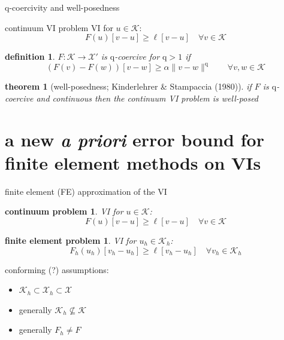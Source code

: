 \documentclass[10pt,svgnames]{beamer}
\newtheorem*{defn}{definition}
\newtheorem*{thm}{theorem}
\newtheorem*{cproblem}{continuum problem}
\newtheorem*{feproblem}{finite element problem}
\newcommand{\cK}{\mathcal{K}}
\newcommand{\cX}{\mathcal{X}}
\newcommand{\qq}{\mathrm{q}}
\newcommand{\aler}[1]{{\color{FireBrick} #1}}
\begin{document}
\begin{frame}{$\qq$-coercivity and well-posedness}

\begin{block}{continuum VI problem}
VI for $u \in \cK$:
$$F(u)[v-u] \ge \ell[v-u] \quad \forall v \in \cK$$
\end{block}

\begin{defn} $F:\cK \to \cX'$ is \aler{$\qq$-coercive} for $\qq>1$ if
  $$\left(F(v)-F(w)\right)[v-w] \ge \alpha \|v-w\|^\qq \qquad \forall v,w \in \cK$$
\end{defn}

\begin{thm}[well-posedness; Kinderlehrer \& Stampaccia (1980)] 
if $F$ is $\qq$-coercive and continuous then the continuum VI problem is well-posed
\end{thm}
\end{frame}



\section{a new \emph{a priori} error bound for finite element methods on VIs}


\begin{frame}{finite element (FE) approximation of the VI}

\begin{cproblem}
VI for $u \in \cK$:
$$F(u)[v-u] \ge \ell[v-u] \quad \forall v \in \cK$$
\end{cproblem}

\begin{feproblem}
VI for $u_h \in \cK_h$:
$$F_h(u_h)[v_h-u_h] \ge \ell[v_h-u_h] \quad \forall v_h \in \cK_h$$
\end{feproblem}

conforming (?) assumptions:
\begin{itemize}
\item $\cK_h \subset \cX_h \subset \cX$

\item<2> \aler{generally $\cK_h \not\subseteq \cK$}
\item<2> \aler{generally $F_h\neq F$}
\end{itemize}

\vspace{-25mm}
\hfill {}
\end{frame}
\end{document}
